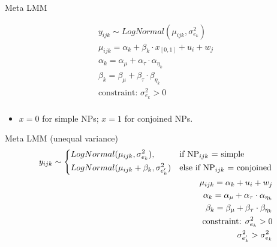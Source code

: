 \begin{frame}[fragile]{Meta LMM}
			
	\begin{equation*}
		\begin{aligned}	
			y_{ijk} \sim LogNormal(\mu_{ijk}, \sigma_{e_k}^2)\\
			\mu_{ijk} = \alpha_k + \beta_k \cdot x_{[0,1]} + u_i + w_j\\
			\alpha_k = \alpha_{\mu} + \alpha_{\tau} \cdot \alpha_{\eta_k}\\
			\beta_k = \beta_{\mu} + \beta_{\tau} \cdot \beta_{\eta_k}\\
			\text{constraint: }\sigma_{e_k}^2>0\\
		\end{aligned}	
	\end{equation*}		
	\begin{small}	
		\begin{itemize}
			\item $x=0$ for simple NPs; $x=1$ for conjoined NPs.
		\end{itemize}
	\end{small}
	
\end{frame}

\begin{frame}[fragile]{Meta LMM (unequal variance)}
	\begin{equation*}
		\begin{aligned}
			y_{ijk} \sim
			\begin{dcases*} 
				LogNormal(\mu_{ijk}, \sigma_{e_k}^2), &  if NP$_{ijk}$ = simple\\
				LogNormal(\mu_{ijk} + \beta_k, \sigma_{e'_k}^2) & else if NP$_{ijk}$ = conjoined\\
			\end{dcases*}\\
			\mu_{ijk} = \alpha_k + u_i + w_j\\
			\alpha_k = \alpha_{\mu} + \alpha_{\tau} \cdot \alpha_{\eta_k}\\
			\beta_k = \beta_{\mu} + \beta_{\tau} \cdot \beta_{\eta_k}\\
			\text{constraint: }\sigma_{e_k}^2>0\\
			\sigma_{e'_k}^2 > \sigma_{e_k}^2
		\end{aligned}
	\end{equation*}

\end{frame}


